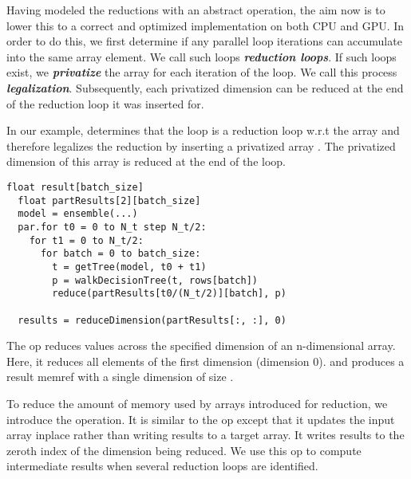 Having modeled the reductions with an abstract operation, the 
aim now is to lower this to a correct and optimized 
implementation on both CPU and GPU. In order to do this, we 
first determine if any parallel loop iterations can accumulate 
into the same array element. We call such loops 
\emph{\textbf{reduction loops}}. If such loops exist, we 
\textbf{\emph{privatize}} the array for each iteration of the
loop. We call this process \textbf{\emph{legalization}}.
Subsequently, each privatized dimension 
can be reduced at the end of the reduction loop it was inserted for. 

In our example, \Treebeard{} determines that the  loop is a reduction 
loop w.r.t the  array and therefore legalizes 
the reduction by inserting a privatized array 
. The privatized dimension of this array 
is reduced at the end of the  loop.

\begin{lstlisting}[style=c++]
  float result[batch_size]
  float partResults[2][batch_size]
  model = ensemble(...) 
  par.for t0 = 0 to N_t step N_t/2:
    for t1 = 0 to N_t/2:
      for batch = 0 to batch_size:
        t = getTree(model, t0 + t1) 
        p = walkDecisionTree(t, rows[batch])
        reduce(partResults[t0/(N_t/2)][batch], p)
  
  results = reduceDimension(partResults[:, :], 0)
\end{lstlisting}

The op  reduces values across the specified
dimension of an n-dimensional array. Here, 
it reduces all elements of the first dimension (dimension 0). 
and produces a result memref with a single dimension of size .

To reduce the amount of memory used by arrays introduced for reduction,
we introduce the  operation. It is similar to the 
 op except that it updates the input array inplace
rather than writing results to a target array. It writes results to the 
zeroth index of the dimension being reduced. We use this op to 
compute intermediate results when several reduction loops are identified.

  
